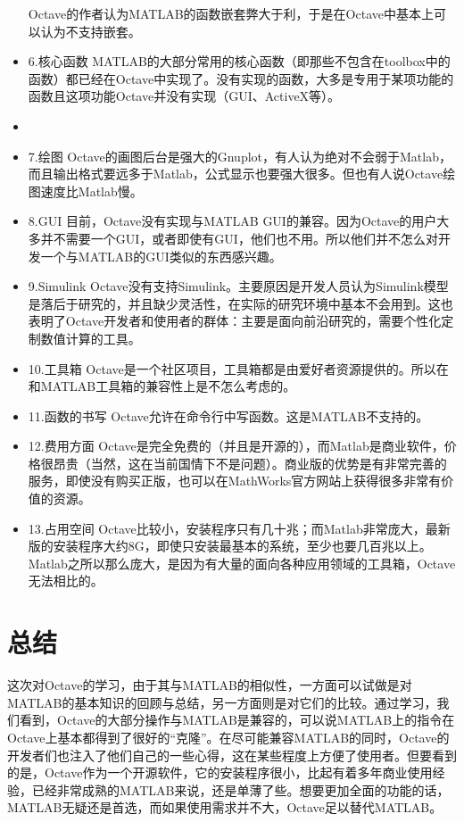 \documentclass[a4paper,11pt]{ctexart}
\begin{document}
\begin{itemize}
    Octave的作者认为MATLAB的函数嵌套弊大于利，于是在Octave中基本上可以认为不支持嵌套。
	 \item 
6.核心函数
    MATLAB的大部分常用的核心函数（即那些不包含在toolbox中的函数）都已经在Octave中实现了。没有实现的函数，大多是专用于某项功能的函数且这项功能Octave并没有实现（GUI、ActiveX等）。
	 \item 
	 \item 
7.绘图
	Octave的画图后台是强大的Gnuplot，有人认为绝对不会弱于Matlab，而且输出格式要远多于Matlab，公式显示也要强大很多。但也有人说Octave绘图速度比Matlab慢。
	 \item 
8.GUI
    目前，Octave没有实现与MATLAB GUI的兼容。因为Octave的用户大多并不需要一个GUI，或者即使有GUI，他们也不用。所以他们并不怎么对开发一个与MATLAB的GUI类似的东西感兴趣。
	 \item 
9.Simulink
    Octave没有支持Simulink。主要原因是开发人员认为Simulink模型是落后于研究的，并且缺少灵活性，在实际的研究环境中基本不会用到。这也表明了Octave开发者和使用者的群体：主要是面向前沿研究的，需要个性化定制数值计算的工具。
	 \item 
10.工具箱
    Octave是一个社区项目，工具箱都是由爱好者资源提供的。所以在和MATLAB工具箱的兼容性上是不怎么考虑的。
	 \item 
11.函数的书写
    Octave允许在命令行中写函数。这是MATLAB不支持的。
	\item
12.费用方面
	Octave是完全免费的（并且是开源的），而Matlab是商业软件，价格很昂贵（当然，这在当前国情下不是问题）。商业版的优势是有非常完善的服务，即使没有购买正版，也可以在MathWorks官方网站上获得很多非常有价值的资源。
	\item
13.占用空间
	Octave比较小，安装程序只有几十兆；而Matlab非常庞大，最新版的安装程序大约8G，即使只安装最基本的系统，至少也要几百兆以上。Matlab之所以那么庞大，是因为有大量的面向各种应用领域的工具箱，Octave无法相比的。
 \end{itemize}
 \newpage
\section{总结}
这次对Octave的学习，由于其与MATLAB的相似性，一方面可以试做是对MATLAB的基本知识的回顾与总结，另一方面则是对它们的比较。通过学习，我们看到，Octave的大部分操作与MATLAB是兼容的，可以说MATLAB上的指令在Octave上基本都得到了很好的“克隆”。在尽可能兼容MATLAB的同时，Octave的开发者们也注入了他们自己的一些心得，这在某些程度上方便了使用者。但要看到的是，Octave作为一个开源软件，它的安装程序很小，比起有着多年商业使用经验，已经非常成熟的MATLAB来说，还是单薄了些。想要更加全面的功能的话，MATLAB无疑还是首选，而如果使用需求并不大，Octave足以替代MATLAB。
\end{document}
